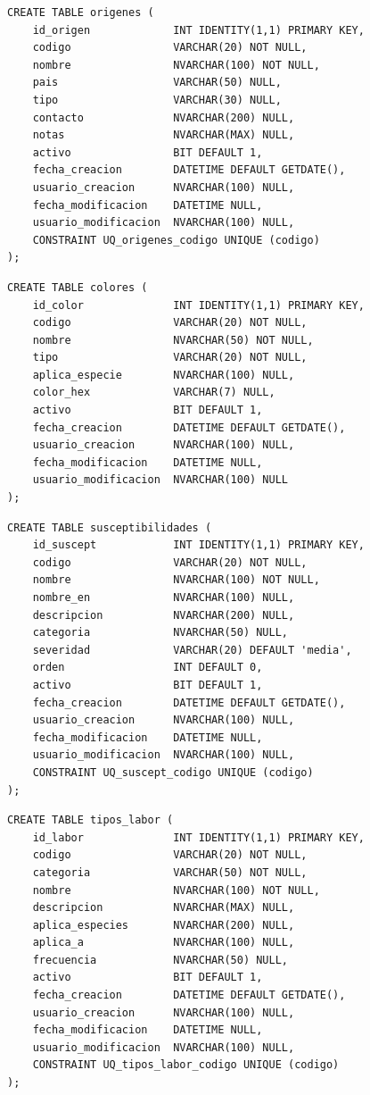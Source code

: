 \documentclass[12pt,a4paper,twoside]{report}
\begin{document}
\begin{lstlisting}[style=sqlstyle, caption={origenes}]
CREATE TABLE origenes (
    id_origen             INT IDENTITY(1,1) PRIMARY KEY,
    codigo                VARCHAR(20) NOT NULL,
    nombre                NVARCHAR(100) NOT NULL,
    pais                  VARCHAR(50) NULL,
    tipo                  VARCHAR(30) NULL,
    contacto              NVARCHAR(200) NULL,
    notas                 NVARCHAR(MAX) NULL,
    activo                BIT DEFAULT 1,
    fecha_creacion        DATETIME DEFAULT GETDATE(),
    usuario_creacion      NVARCHAR(100) NULL,
    fecha_modificacion    DATETIME NULL,
    usuario_modificacion  NVARCHAR(100) NULL,
    CONSTRAINT UQ_origenes_codigo UNIQUE (codigo)
);
\end{lstlisting}

\begin{lstlisting}[style=sqlstyle, caption={colores}]
CREATE TABLE colores (
    id_color              INT IDENTITY(1,1) PRIMARY KEY,
    codigo                VARCHAR(20) NOT NULL,
    nombre                NVARCHAR(50) NOT NULL,
    tipo                  VARCHAR(20) NOT NULL,
    aplica_especie        NVARCHAR(100) NULL,
    color_hex             VARCHAR(7) NULL,
    activo                BIT DEFAULT 1,
    fecha_creacion        DATETIME DEFAULT GETDATE(),
    usuario_creacion      NVARCHAR(100) NULL,
    fecha_modificacion    DATETIME NULL,
    usuario_modificacion  NVARCHAR(100) NULL
);
\end{lstlisting}

\begin{lstlisting}[style=sqlstyle, caption={susceptibilidades}]
CREATE TABLE susceptibilidades (
    id_suscept            INT IDENTITY(1,1) PRIMARY KEY,
    codigo                VARCHAR(20) NOT NULL,
    nombre                NVARCHAR(100) NOT NULL,
    nombre_en             NVARCHAR(100) NULL,
    descripcion           NVARCHAR(200) NULL,
    categoria             NVARCHAR(50) NULL,
    severidad             VARCHAR(20) DEFAULT 'media',
    orden                 INT DEFAULT 0,
    activo                BIT DEFAULT 1,
    fecha_creacion        DATETIME DEFAULT GETDATE(),
    usuario_creacion      NVARCHAR(100) NULL,
    fecha_modificacion    DATETIME NULL,
    usuario_modificacion  NVARCHAR(100) NULL,
    CONSTRAINT UQ_suscept_codigo UNIQUE (codigo)
);
\end{lstlisting}

\begin{lstlisting}[style=sqlstyle, caption={tipos\_labor}]
CREATE TABLE tipos_labor (
    id_labor              INT IDENTITY(1,1) PRIMARY KEY,
    codigo                VARCHAR(20) NOT NULL,
    categoria             VARCHAR(50) NOT NULL,
    nombre                NVARCHAR(100) NOT NULL,
    descripcion           NVARCHAR(MAX) NULL,
    aplica_especies       NVARCHAR(200) NULL,
    aplica_a              NVARCHAR(100) NULL,
    frecuencia            NVARCHAR(50) NULL,
    activo                BIT DEFAULT 1,
    fecha_creacion        DATETIME DEFAULT GETDATE(),
    usuario_creacion      NVARCHAR(100) NULL,
    fecha_modificacion    DATETIME NULL,
    usuario_modificacion  NVARCHAR(100) NULL,
    CONSTRAINT UQ_tipos_labor_codigo UNIQUE (codigo)
);
\end{lstlisting}
\end{document}
